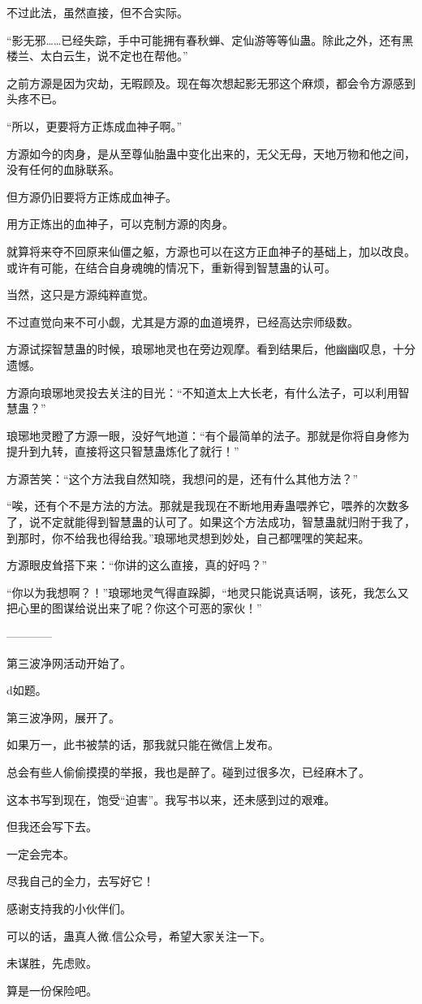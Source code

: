 \begin{this_body}
不过此法，虽然直接，但不合实际。

“影无邪……已经失踪，手中可能拥有春秋蝉、定仙游等等仙蛊。除此之外，还有黑楼兰、太白云生，说不定也在帮他。”

之前方源是因为灾劫，无暇顾及。现在每次想起影无邪这个麻烦，都会令方源感到头疼不已。

“所以，更要将方正炼成血神子啊。”

方源如今的肉身，是从至尊仙胎蛊中变化出来的，无父无母，天地万物和他之间，没有任何的血脉联系。

但方源仍旧要将方正炼成血神子。

用方正炼出的血神子，可以克制方源的肉身。

就算将来夺不回原来仙僵之躯，方源也可以在这方正血神子的基础上，加以改良。或许有可能，在结合自身魂魄的情况下，重新得到智慧蛊的认可。

当然，这只是方源纯粹直觉。

不过直觉向来不可小觑，尤其是方源的血道境界，已经高达宗师级数。

方源试探智慧蛊的时候，琅琊地灵也在旁边观摩。看到结果后，他幽幽叹息，十分遗憾。

方源向琅琊地灵投去关注的目光：“不知道太上大长老，有什么法子，可以利用智慧蛊？”

琅琊地灵瞪了方源一眼，没好气地道：“有个最简单的法子。那就是你将自身修为提升到九转，直接将这只智慧蛊炼化了就行！”

方源苦笑：“这个方法我自然知晓，我想问的是，还有什么其他方法？”

“唉，还有个不是方法的方法。那就是我现在不断地用寿蛊喂养它，喂养的次数多了，说不定就能得到智慧蛊的认可了。如果这个方法成功，智慧蛊就归附于我了，到那时，你不给我也得给我。”琅琊地灵想到妙处，自己都嘿嘿的笑起来。

方源眼皮耸搭下来：“你讲的这么直接，真的好吗？”

“你以为我想啊？！”琅琊地灵气得直跺脚，“地灵只能说真话啊，该死，我怎么又把心里的图谋给说出来了呢？你这个可恶的家伙！”

------------

第三波净网活动开始了。

d如题。

第三波净网，展开了。

如果万一，此书被禁的话，那我就只能在微信上发布。

总会有些人偷偷摸摸的举报，我也是醉了。碰到过很多次，已经麻木了。

这本书写到现在，饱受“迫害”。我写书以来，还未感到过的艰难。

但我还会写下去。

一定会完本。

尽我自己的全力，去写好它！

感谢支持我的小伙伴们。

可以的话，蛊真人微.信公众号，希望大家关注一下。

未谋胜，先虑败。

算是一份保险吧。

\end{this_body}

